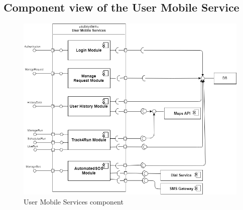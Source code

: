 \subsection{Component view of the User Mobile Service}

\begin{figure}[H]
    \centering
    \includegraphics[scale=0.4]{DD/Pictures/UserServicesDiagram.png}
    \caption{User Mobile Services component }
\end{figure}

